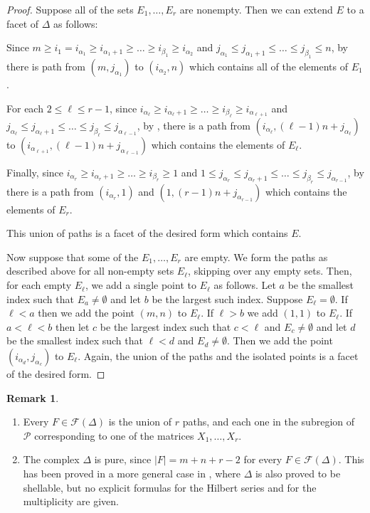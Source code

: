 \documentclass[12pt]{amsart}
\numberwithin{equation}{section}
\theoremstyle{definition}
\newtheorem{remark}[theorem]{Remark}
\begin{document}
\begin{proof}
Suppose all of the sets $E_1, \dots, E_r$ are nonempty.  Then we can extend $E$ to a facet of $\Delta$ as follows:

Since $m\geq i_1= i_{\alpha_1} \geq i_{\alpha_1+1} \geq \dots \geq i_{\beta_1}\geq i_{\alpha_2}$ and $j_{\alpha_1}\leq j_{\alpha_1+1}\leq \dots \leq j_{\beta_1}\leq n$, by  there is path from $(m, j_{\alpha_1})$ to $(i_{\alpha_2}, n)$ which contains all of the elements of $E_1$.  
  
 For each $2 \leq \ell \leq r-1$, since $i_{\alpha_\ell} \geq i_{\alpha_\ell+1} \geq \dots \geq i_{\beta_\ell} \geq i_{\alpha_{\ell+1}}$ and $j_{\alpha_\ell} \leq j_{\alpha_\ell+1} \leq \dots \leq j_{\beta_\ell} \leq j_{\alpha_{\ell-1}}$, by , there is a path from $(i_{\alpha_\ell}, (\ell-1)n+j_{\alpha_\ell})$ to $(i_{\alpha_{\ell+1}}, (\ell-1)n+j_{\alpha_{\ell-1}})$ which contains the elements of $E_\ell$. 
 
 
Finally, since $i_{\alpha_r} \geq i_{\alpha_r+1} \geq \dots \geq i_{\beta_r} \geq  1$ and $1\leq j_{\alpha_{r}} \leq j_{\alpha_{r}+1} \leq \dots \leq j_{\beta_r} \leq j_{\alpha_{r-1}}$, by  there is a path from $(i_{\alpha_r}, 1)$ and $(1, (r-1)n+j_{\alpha_{r-1}})$ which contains the elements of $E_r$.  

This union of paths is a facet of the desired form which contains $E$.

Now suppose that some of the $E_1, \dots, E_r$ are empty.  We form the paths as described above for all non-empty sets $E_\ell$, skipping over any empty sets.  Then, for each empty $E_\ell$, we add a single point to $E_\ell$ as follows.  Let $a$ be the smallest index such that $E_a \neq \emptyset$ and let $b$ be the largest such index.  Suppose $E_\ell = \emptyset$.  If $\ell <a$ then we add the point $(m,n)$ to $E_\ell$.  If $\ell >b$ we add $(1,1)$ to $E_\ell$.  If $a < \ell <b$ then let $c$ be the largest index such that $c<\ell$ and $E_c \neq \emptyset$ and let $d$ be the smallest index such that $\ell <d$ and $E_d \neq \emptyset$.  Then we add the point $(i_{\alpha_d}, j_{\alpha_c})$ to $E_\ell$.  Again, the union of the paths and the isolated points is a facet of the desired form.  
\end{proof}


\begin{remark}
\begin{enumerate}
   \item   Every $F\in\mathcal F(\Delta)$ is the union of $r$ paths, and each one in the subregion of $\mathcal{P}$ corresponding to one of the  matrices $X_1,\ldots, X_r$.
   \item The complex  $\Delta$ is pure, since $|F|=m+n+r-2$ for every $F\in\mathcal{F}(\Delta)$. This has been proved in a more general case in \cite{L}, where $\Delta$ is also proved to be shellable, but no explicit formulas for the Hilbert series and for the multiplicity are given.
\end{enumerate}
\end{remark}
\end{document}
